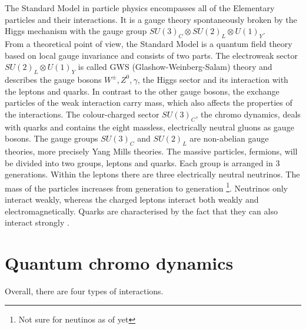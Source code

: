 The Standard Model in particle physics encompasses all of the
Elementary particles and their interactions. It is a gauge theory spontaneously broken by the Higgs mechanism with the gauge group $ SU(3)_C \otimes SU(2)_L \otimes U(1)_Y $.\\
From a theoretical point of view, the Standard Model is a quantum field theory based on local gauge invariance and consists of two parts. The electroweak sector $ SU(2)_L \otimes U(1)_Y $ is called GWS (Glashow-Weinberg-Salam) theory and describes the gauge bosons $ W^{\pm}, Z^0, \gamma $, the Higgs sector and its interaction with the leptons and quarks. In contrast to the other gauge bosons, the exchange particles of the weak interaction carry mass, which also affects the properties of the interactions. The colour-charged sector $ SU(3)_C $, the chromo dynamics, deals with quarks and contains the eight massless, electrically neutral gluons as gauge bosons. The gauge groups $SU(3)_C$ and $SU(2)_L$ are 
non-abelian gauge theories, more precisely Yang Mills theories.
The massive particles, fermions, will be divided into two groups, leptons and quarks. Each group is arranged in 3 generations. Within the leptons there are three electrically neutral neutrinos. The mass of the particles increases from generation to generation \footnote{Not sure for neutinos as of yet}. Neutrinos only interact weakly, whereas the charged leptons interact both weakly and electromagnetically. Quarks are characterised by the fact that they can also interact strongly \cite{edelhaeuser2016tutorium}. 

\section{Quantum chromo dynamics}

Overall, there are four types of interactions.\\


